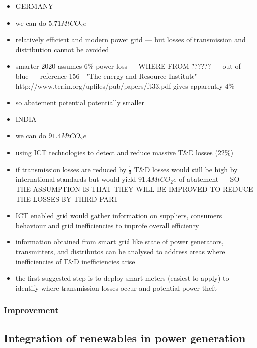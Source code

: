 \documentclass[11pt, twocolumn]{article}
\begin{document}
\begin{itemize}
\item GERMANY
\item we can do $5.71 Mt CO_2e$
\item relatively efficient and modern power grid --- but losses of transmission and distribution cannot be avoided
\item smarter 2020 assumes 6\% power loss --- WHERE FROM ?????? --- out of blue --- reference 156 - "The energy and Resource Institute" --- http://www.teriin.org/upfiles/pub/papers/ft33.pdf gives apparently 4\%
\item so abatement potential potentially smaller

\item INDIA
\item we can do $91.4 Mt CO_2e$
\item using ICT technologies to detect and reduce massive T\&D losses (22\%)
\item if transmission losses are reduced by $\frac{1}{3}$ T\&D losses would still be high by international standards but would yield $91.4 MtCO_2e$ of abatement --- SO THE ASSUMPTION IS THAT THEY WILL BE IMPROVED TO REDUCE THE LOSSES BY THIRD PART
\item ICT enabled grid would gather information on suppliers, consumers behaviour and grid inefficiencies to improfe overall efficiency
\item information obtained from smart grid like state of power generators, transmitters, and distributos can be analysed to address areas where inefficiencies of T\&D inefficiencies arise
\item the first suggested step is to deploy smart meters (easiest to apply) to identify where transmission losses occur and potential power theft

\end{itemize}
\subsubsection{Improvement}

\subsection{Integration of renewables in power generation}
\end{document}
